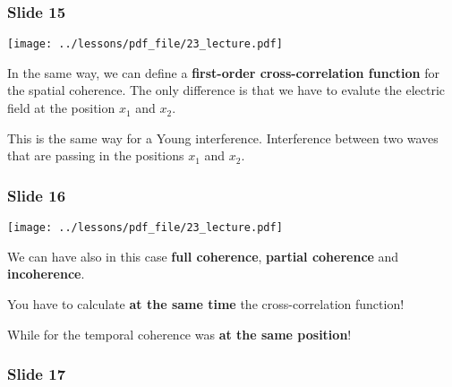 \documentclass[../main/main.tex]{subfiles}
\begin{document}
\subsubsection*{Slide 15}

\begin{minipage}[]{0.5\linewidth}
\centering
\texttt{[image: ../lessons/pdf\_file/23\_lecture.pdf]}
\end{minipage}
\hspace{0.3cm}\vspace{0.3cm}
\begin{minipage}[c]{0.47\linewidth}

In the same way, we can define a \textbf{first-order cross-correlation function} for the spatial coherence. The only difference is that we have to evalute the electric field at the position \( x_1 \) and \( x_2 \).

This is the same way for a Young interference.
Interference between two waves that are passing in the positions \( x_1 \) and \( x_2 \).

\end{minipage}

\subsubsection*{Slide 16}

\begin{minipage}[]{0.5\linewidth}
\centering
\texttt{[image: ../lessons/pdf\_file/23\_lecture.pdf]}
\end{minipage}
\hspace{0.3cm}\vspace{0.3cm}
\begin{minipage}[c]{0.47\linewidth}

We can have also in this case \textbf{full coherence}, \textbf{partial coherence} and \textbf{incoherence}.

You have to calculate \textbf{at the same time} the cross-correlation function!

While for the temporal coherence was \textbf{at the same position}!

\end{minipage}

\subsubsection*{Slide 17}
\end{document}
